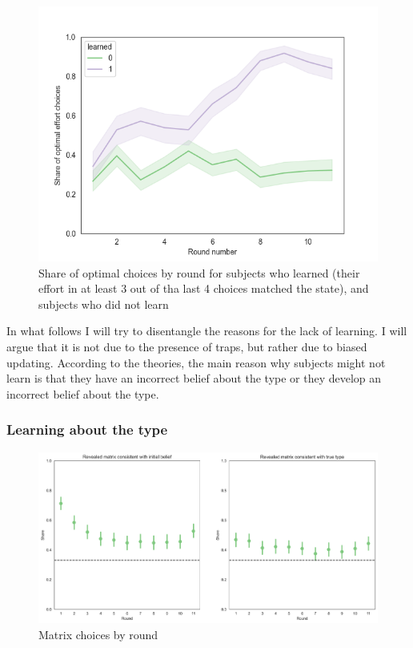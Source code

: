 \documentclass[
  12pt,
]{article}
\begin{document}
\begin{figure}
\hypertarget{fig:learning-by-groups}{%
\centering
\includegraphics{../figures/learning_groups.png}
\caption{Share of optimal choices by round for subjects who learned
(their effort in at least 3 out of tha last 4 choices matched the
state), and subjects who did not learn}\label{fig:learning-by-groups}
}
\end{figure}

In what follows I will try to disentangle the reasons for the lack of
learning. I will argue that it is not due to the presence of traps, but
rather due to biased updating. According to the theories, the main
reason why subjects might not learn is that they have an incorrect
belief about the type or they develop an incorrect belief about the
type.

\hypertarget{learning-about-the-type}{%
\subsubsection{Learning about the type}\label{learning-about-the-type}}

\begin{figure}
\hypertarget{fig:matrix-choices-by-round}{%
\centering
\includegraphics{../figures/last_button_consistency.png}
\caption{Matrix choices by round}\label{fig:matrix-choices-by-round}
}
\end{figure}
\end{document}
